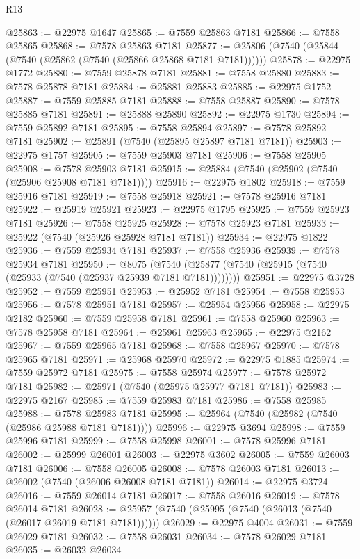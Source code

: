 \begin{lexlean}{R13}
\begin{coremodule}
@25863 := @22975 @1647
@25865 := @7559 @25863 @7181
@25866 := @7558 @25865
@25868 := @7578 @25863 @7181
@25877 := @25806 (@7540 (@25844 (@7540 (@25862 (@7540 (@25866 @25868 @7181 @7181))))))
@25878 := @22975 @1772
@25880 := @7559 @25878 @7181
@25881 := @7558 @25880
@25883 := @7578 @25878 @7181
@25884 := @25881 @25883
@25885 := @22975 @1752
@25887 := @7559 @25885 @7181
@25888 := @7558 @25887
@25890 := @7578 @25885 @7181
@25891 := @25888 @25890
@25892 := @22975 @1730
@25894 := @7559 @25892 @7181
@25895 := @7558 @25894
@25897 := @7578 @25892 @7181
@25902 := @25891 (@7540 (@25895 @25897 @7181 @7181))
@25903 := @22975 @1757
@25905 := @7559 @25903 @7181
@25906 := @7558 @25905
@25908 := @7578 @25903 @7181
@25915 := @25884 (@7540 (@25902 (@7540 (@25906 @25908 @7181 @7181))))
@25916 := @22975 @1802
@25918 := @7559 @25916 @7181
@25919 := @7558 @25918
@25921 := @7578 @25916 @7181
@25922 := @25919 @25921
@25923 := @22975 @1795
@25925 := @7559 @25923 @7181
@25926 := @7558 @25925
@25928 := @7578 @25923 @7181
@25933 := @25922 (@7540 (@25926 @25928 @7181 @7181))
@25934 := @22975 @1822
@25936 := @7559 @25934 @7181
@25937 := @7558 @25936
@25939 := @7578 @25934 @7181
@25950 := @8075
    (@7540 (@25877 (@7540 (@25915 (@7540 (@25933 (@7540 (@25937 @25939 @7181 @7181))))))))
@25951 := @22975 @3728
@25952 := @7559 @25951
@25953 := @25952 @7181
@25954 := @7558 @25953
@25956 := @7578 @25951 @7181
@25957 := @25954 @25956
@25958 := @22975 @2182
@25960 := @7559 @25958 @7181
@25961 := @7558 @25960
@25963 := @7578 @25958 @7181
@25964 := @25961 @25963
@25965 := @22975 @2162
@25967 := @7559 @25965 @7181
@25968 := @7558 @25967
@25970 := @7578 @25965 @7181
@25971 := @25968 @25970
@25972 := @22975 @1885
@25974 := @7559 @25972 @7181
@25975 := @7558 @25974
@25977 := @7578 @25972 @7181
@25982 := @25971 (@7540 (@25975 @25977 @7181 @7181))
@25983 := @22975 @2167
@25985 := @7559 @25983 @7181
@25986 := @7558 @25985
@25988 := @7578 @25983 @7181
@25995 := @25964 (@7540 (@25982 (@7540 (@25986 @25988 @7181 @7181))))
@25996 := @22975 @3694
@25998 := @7559 @25996 @7181
@25999 := @7558 @25998
@26001 := @7578 @25996 @7181
@26002 := @25999 @26001
@26003 := @22975 @3602
@26005 := @7559 @26003 @7181
@26006 := @7558 @26005
@26008 := @7578 @26003 @7181
@26013 := @26002 (@7540 (@26006 @26008 @7181 @7181))
@26014 := @22975 @3724
@26016 := @7559 @26014 @7181
@26017 := @7558 @26016
@26019 := @7578 @26014 @7181
@26028 := @25957 (@7540 (@25995 (@7540 (@26013 (@7540 (@26017 @26019 @7181 @7181))))))
@26029 := @22975 @4004
@26031 := @7559 @26029 @7181
@26032 := @7558 @26031
@26034 := @7578 @26029 @7181
@26035 := @26032 @26034

\end{coremodule}
\end{lexlean}
